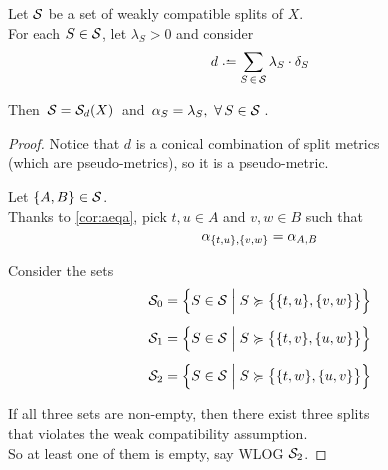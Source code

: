 \documentclass[./main.tex]{subfiles}
\begin{document}
\begin{theorem}[{\cites[Theorem 3]{BD92a}}] \label{teo:teo3}
    Let ${\mathcal{S}}$ be a set of weakly compatible splits of $X$. \\
    For each $S \in {\mathcal{S}}$, let $\lambda_S > 0$ and consider
    \[ d \defeq \sum_{S \,\in\, \Sc} \lambda_S \cdot \delta_S \]

    Then $\, {\mathcal{S}} = {\mathcal{S}}_d(X) \,$ and $\, \alpha_S = \lambda_S,\ \forall\, S \in {\mathcal{S}} \,$.
\end{theorem}
\begin{proof}
    Notice that $d$ is a conical combination of split metrics \\
    \bsp (which are pseudo-metrics), so it is a pseudo-metric.

    Let $\{A,B\} \in {\mathcal{S}}$. \\
    Thanks to \autoref{cor:aeqa}, pick $t,u \in A$ and $v,w \in B$ such that
    \[ \alpha_{\{t,u\},\{v,w\}} = \alpha_{A,B} \]

    Consider the sets
    \begin{align*}
        {\mathcal{S}}_0 &= \Bigl\{ S \in {\mathcal{S}} \mathrel{\Big|} S \succcurlyeq \bigl\{ \{t,u\},\{v,w\} \bigr\} \Bigr\} \\[5pt]
        {\mathcal{S}}_1 &= \Bigl\{ S \in {\mathcal{S}} \mathrel{\Big|} S \succcurlyeq \bigl\{ \{t,v\},\{u,w\} \bigr\} \Bigr\} \\[5pt]
        {\mathcal{S}}_2 &= \Bigl\{ S \in {\mathcal{S}} \mathrel{\Big|} S \succcurlyeq \bigl\{ \{t,w\},\{u,v\} \bigr\} \Bigr\}
    \end{align*}

\clearpage

    If all three sets are non-empty, then there exist three splits \\
    \bsp that violates the weak compatibility assumption. \\
    So at least one of them is empty, say WLOG ${\mathcal{S}}_2$.
    

\end{proof}
\end{document}
